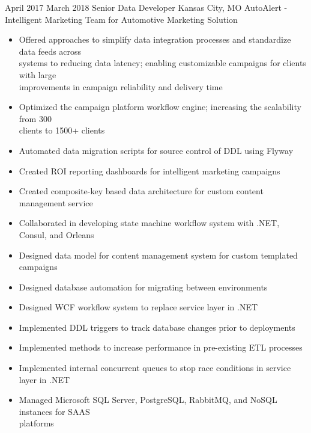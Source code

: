 
\ProjectExperience
{April 2017}
{March 2018}
{Senior Data Developer}
{Kansas City, MO}
{AutoAlert - Intelligent Marketing Team for Automotive Marketing Solution}
{\begin{itemize}
    \item Offered approaches to simplify data integration processes and standardize data feeds
    across \\systems to reducing data latency; enabling customizable campaigns for clients with
    large \\improvements in campaign reliability and delivery time
   \item Optimized the campaign platform workflow engine; increasing the scalability from 300
    \\clients to 1500+ clients
    \item Automated data migration scripts for source control of DDL using Flyway
    \item Created ROI reporting dashboards for intelligent marketing campaigns
    \item Created composite-key based data architecture for custom content management service
\end{itemize}}
{\begin{itemize}
    \item Collaborated in developing state machine workflow system with .NET, Consul, and Orleans
    \item Designed data model for content management system for custom templated campaigns
    \item Designed database automation for migrating between environments
    \item Designed WCF workflow system to replace service layer in .NET
\end{itemize}}
{\begin{itemize}
    \item Implemented DDL triggers to track database changes prior to deployments
    \item Implemented methods to increase performance in pre-existing ETL processes
    \item Implemented internal concurrent queues to stop race conditions in service layer in .NET
    \item Managed Microsoft SQL Server, PostgreSQL, RabbitMQ, and NoSQL instances for SAAS
    \\platforms
\end{itemize}}

